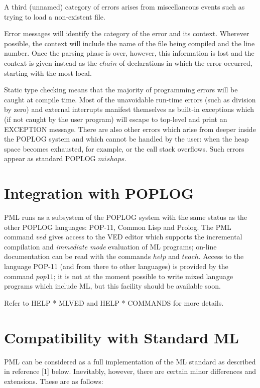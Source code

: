 A third (unnamed) category of errors arises from miscellaneous events
such as trying to load a non-existent file.

Error messages will identify the category of the error and its context.
Wherever possible, the context will include the name of the file being
compiled and the line number. Once the parsing phase is over, however,
this information is lost and the context is given instead as the $chain$
of declarations in which the error occurred, starting with the most
local.

Static type checking means that the majority of programming errors will
be caught at compile time. Most of the unavoidable run-time errors (such
as division by zero) and external interrupts manifest themselves as
built-in exceptions which (if not caught by the user program) will
escape to top-level and print an EXCEPTION message. There are also other
errors which arise from deeper inside the POPLOG system and which cannot
be handled by the user: when the heap space becomes exhausted, for
example, or the call stack overflows. Such errors appear as standard
POPLOG $mishaps$.


\section{Integration with POPLOG}                                                           

PML runs as a subsystem of the POPLOG system with the same status as the
other POPLOG languages: POP-11, Common Lisp and Prolog. The PML command
$ved$ gives access to the VED editor which supports the incremental
compilation and {\em immediate mode} evaluation of ML programs; on-line
documentation can be read with the commands $help$ and $teach$. Access
to the language POP-11 (and from there to other languages) is provided
by the command $pop11$; it is not at the moment possible to write mixed
language programs which include ML, but this facility should be
available soon.

Refer to HELP * MLVED and HELP * COMMANDS for more details.


\section{Compatibility with Standard ML}                                                    

PML can be considered as a full implementation of the ML standard as
described in reference [1] below. Inevitably, however, there are certain
minor differences and extensions. These are as follows:

